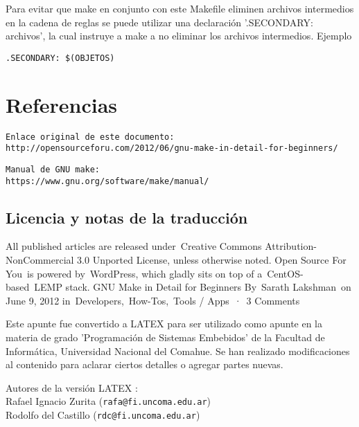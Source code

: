 \documentclass[12pt]{article}
\begin{document}
Para evitar que make en conjunto con este Makefile eliminen archivos
intermedios en la cadena de reglas
se puede utilizar una declaración '.SECONDARY: archivos', la cual instruye a make a no eliminar los archivos intermedios. Ejemplo

\begin{verbatim}
.SECONDARY: $(OBJETOS)
\end{verbatim}

\section*{Referencias}

\begin{verbatim}
Enlace original de este documento:
http://opensourceforu.com/2012/06/gnu-make-in-detail-for-beginners/
\end{verbatim}

\begin{verbatim}
Manual de GNU make:
https://www.gnu.org/software/make/manual/
\end{verbatim}

\subsection*{Licencia y notas de la traducción}

All published articles are released under Creative Commons Attribution-NonCommercial 3.0 Unported License, unless otherwise noted.
Open Source For You is powered by WordPress, which gladly sits on top of a CentOS-based LEMP stack.
GNU Make in Detail for Beginners
By Sarath Lakshman on June 9, 2012 in Developers, How-Tos, Tools / Apps · 3 Comments

Este apunte fue convertido a LATEX para 
ser utilizado como apunte en la materia de grado
'Programación de Sistemas Embebidos' de la Facultad de Informática,
Universidad Nacional del Comahue.
Se han realizado modificaciones
al contenido para aclarar ciertos detalles o agregar partes nuevas.

Autores de la versión LATEX : \\
Rafael Ignacio Zurita ({\tt rafa@fi.uncoma.edu.ar}) \\
Rodolfo del Castillo ({\tt rdc@fi.uncoma.edu.ar})
\end{document}
